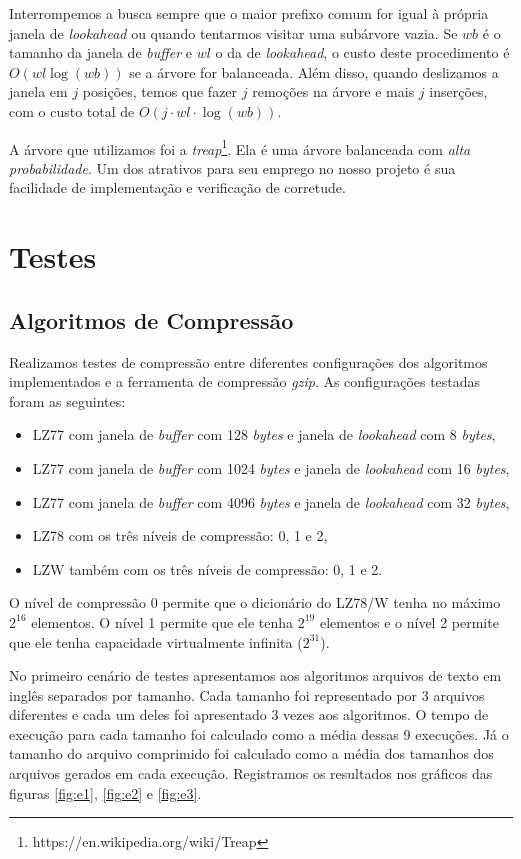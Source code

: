 \documentclass[]{article}
\begin{document}
Interrompemos a busca sempre que o maior prefixo comum for igual à própria janela de \textit{lookahead} ou quando tentarmos visitar uma subárvore vazia. Se $wb$ é o tamanho da janela de \textit{buffer} e $wl$ o da de \textit{lookahead}, o custo deste procedimento é $O(wl\log(wb))$ se a árvore for balanceada. Além disso, quando deslizamos a janela em $j$ posições, temos que fazer $j$ remoções na árvore e mais $j$ inserções, com o custo total de $O(j\cdot wl\cdot \log(wb))$.

A árvore que utilizamos foi a \textit{treap}\footnote{https://en.wikipedia.org/wiki/Treap}. Ela é uma árvore balanceada com \textit{alta probabilidade}. Um dos atrativos para seu emprego no nosso projeto é sua facilidade de implementação e verificação de corretude.

\section{Testes}

\subsection{Algoritmos de Compressão}


Realizamos testes de compressão entre diferentes configurações dos algoritmos implementados e a ferramenta de compressão \textit{gzip}. As configurações testadas foram as seguintes:
\begin{itemize}
	\item LZ77 com janela de \textit{buffer} com 128 \textit{bytes} e janela de \textit{lookahead} com 8 \textit{bytes},
	\item LZ77 com janela de \textit{buffer} com 1024 \textit{bytes} e janela de \textit{lookahead} com 16 \textit{bytes},
	\item LZ77 com janela de \textit{buffer} com 4096 \textit{bytes} e janela de \textit{lookahead} com 32 \textit{bytes},
	\item LZ78 com os três níveis de compressão: 0, 1 e 2, 
	\item LZW também com os três níveis de compressão: 0, 1 e 2.
\end{itemize}

O nível de compressão 0 permite que o dicionário do LZ78/W tenha no máximo $2^{16}$ elementos. O nível 1 permite que ele tenha $2^{19}$ elementos e o nível 2 permite que ele tenha capacidade virtualmente infinita ($2^{31}$).

No primeiro cenário de testes apresentamos aos algoritmos arquivos de texto em inglês separados por tamanho. Cada tamanho foi representado por 3 arquivos diferentes e cada um deles foi apresentado 3 vezes aos algoritmos. O tempo de execução para cada tamanho foi calculado como a média dessas 9 execuções. Já o tamanho do arquivo comprimido foi calculado como a média dos tamanhos dos arquivos gerados em cada execução. Registramos os resultados nos gráficos das figuras \ref{fig:e1}, \ref{fig:e2} e \ref{fig:e3}.
\end{document}
